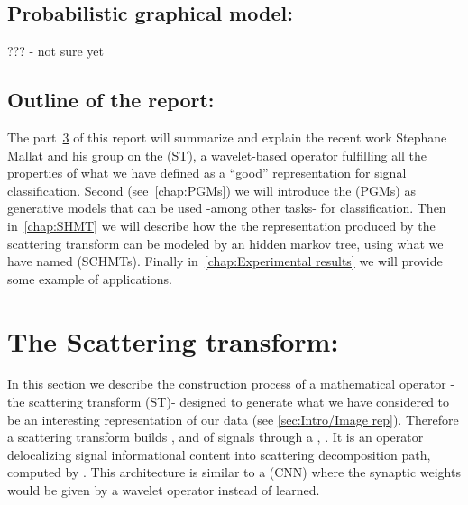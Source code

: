 \documentclass[a4paper,11pt]{report}
\begin{document}
	\section{Probabilistic graphical model:}
		??? - not sure yet
    
	\section{Outline of the report:}
    \label{sec:Intro/Outline of the report}    
		The part~\ref{chap:ST} of this report will summarize and explain the recent work Stephane Mallat and his group on the  (ST), a wavelet-based operator fulfilling all the properties of what we have defined as a ``good'' representation for signal classification. Second (see~\ref{chap:PGMs}) we will introduce the  (PGMs) as generative models that can be used -among other tasks- for classification. Then in~\ref{chap:SHMT} we will describe how the the representation produced by the scattering transform can be modeled by an hidden markov tree, using what we have named  (SCHMTs). Finally in~\ref{chap:Experimental results} we will provide some example of applications.


\chapter{The Scattering transform:}
  \label{chap:ST}
  
	In this section we describe the construction process of a mathematical operator - the scattering transform (ST)- designed to generate what we have considered to be an interesting representation of our data (see \ref{sec:Intro/Image rep}). Therefore a scattering transform builds ,  and  of signals through a ,
  . It is an operator delocalizing signal informational content into scattering decomposition path, computed by .
  This architecture is similar to a  (CNN) where the synaptic weights would be given by a wavelet operator instead of learned.\\
  
\end{document}
